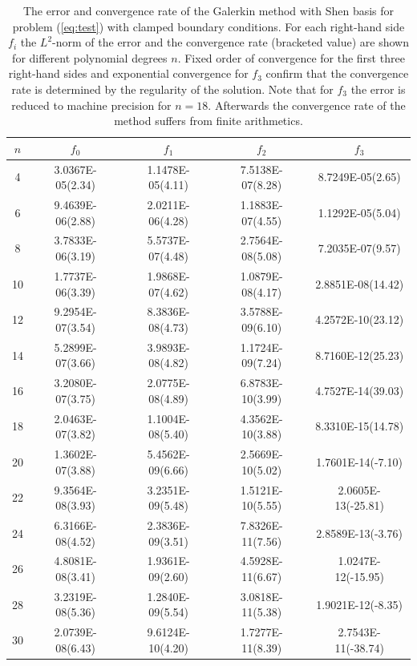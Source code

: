 \documentclass{marine_2015}
\begin{document}
\begin{table}[t!]
    \begin{center}
    \begin{tabular}{ccccc}
\hline
$n$  &  $f_0$  & $f_1$ & $f_2$ & $f_3$\\
\hline
4 &  3.0367E-05(2.34)& 1.1478E-05(4.11)& 7.5138E-07(8.28)& 8.7249E-05(2.65)  \\ 
6 &  9.4639E-06(2.88)& 2.0211E-06(4.28)& 1.1883E-07(4.55)& 1.1292E-05(5.04) \\
8 &  3.7833E-06(3.19)& 5.5737E-07(4.48)& 2.7564E-08(5.08)& 7.2035E-07(9.57) \\
10&  1.7737E-06(3.39)& 1.9868E-07(4.62)& 1.0879E-08(4.17)& 2.8851E-08(14.42) \\
12&  9.2954E-07(3.54)& 8.3836E-08(4.73)& 3.5788E-09(6.10)& 4.2572E-10(23.12) \\
14&  5.2899E-07(3.66)& 3.9893E-08(4.82)& 1.1724E-09(7.24)& 8.7160E-12(25.23) \\
16&  3.2080E-07(3.75)& 2.0775E-08(4.89)& 6.8783E-10(3.99)& 4.7527E-14(39.03) \\
18&  2.0463E-07(3.82)& 1.1004E-08(5.40)& 4.3562E-10(3.88)& 8.3310E-15(14.78) \\
20&  1.3602E-07(3.88)& 5.4562E-09(6.66)& 2.5669E-10(5.02)& 1.7601E-14(-7.10) \\
22&  9.3564E-08(3.93)& 3.2351E-09(5.48)& 1.5121E-10(5.55)& 2.0605E-13(-25.81)\\
24&  6.3166E-08(4.52)& 2.3836E-09(3.51)& 7.8326E-11(7.56)& 2.8589E-13(-3.76) \\
26&  4.8081E-08(3.41)& 1.9361E-09(2.60)& 4.5928E-11(6.67)& 1.0247E-12(-15.95)\\
28&  3.2319E-08(5.36)& 1.2840E-09(5.54)& 3.0818E-11(5.38)& 1.9021E-12(-8.35) \\
30&  2.0739E-08(6.43)& 9.6124E-10(4.20)& 1.7277E-11(8.39)& 2.7543E-11(-38.74)\\
\hline
    \end{tabular}
    \caption{
    The error and convergence rate of the Galerkin method with Shen basis for
    problem (\ref{eq:test}) with clamped boundary conditions. For each
    right-hand side $f_i$ the $L^2$-norm of the error and the convergence rate
    (bracketed value) are shown for different polynomial degrees $n$. Fixed order of
    convergence for the first three right-hand sides and exponential convergence
    for $f_3$ confirm that the convergence rate is determined by the regularity of 
    the solution. Note that for $f_3$ the error is reduced to machine precision
    for $n=18$. Afterwards the convergence rate of the method suffers from
    finite arithmetics.}
  \label{tab:shen_convergence}
  \end{center}
  \end{table}
\end{document}
